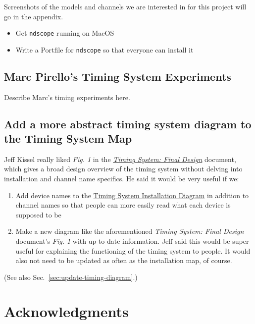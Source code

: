 \documentclass{article}
\newcommand*{\TODO}{\textcolor{todo}}
\begin{document}
\TODO{Screenshots of the models and channels we are interested in for this project will go in the appendix.}

\begin{itemize}
    \item \TODO{Get \texttt{ndscope} running on MacOS}
    \item \TODO{Write a Portfile for \texttt{ndscope} so that everyone can install it}
\end{itemize}

\subsection{\label{sec:marc-pirello}Marc Pirello's Timing System Experiments}

\TODO{Describe Marc's timing experiments here.}

\subsection{Add a more abstract timing system diagram to the Timing System Map}

Jeff Kissel really liked \textit{Fig. 1} in the \textit{\href{https://dcc.ligo.org/LIGO-T070173}{Timing System: Final Design}} document, which gives a broad design overview of the timing system without delving into installation and channel name specifics. He said it would be very useful if we:

\begin{enumerate}
    \item{\TODO{Add device names} to the \href{https://dcc.ligo.org/LIGO-D1500201}{Timing System Installation Diagram} in addition to channel names so that people can more easily read what each device is supposed to be}
    \item{\TODO{Make a new diagram like the aforementioned \textit{Timing System: Final Design} document's \textit{Fig. 1} with up-to-date information}. Jeff said this would be super useful for explaining the functioning of the timing system to people. It would also not need to be updated as often as the installation map, of course.}
\end{enumerate}

(See also Sec.~\ref{sec:update-timing-diagram}.)

\section{Acknowledgments}
\end{document}
